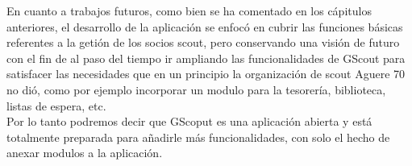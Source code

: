 En cuanto a trabajos futuros, como bien se ha comentado en los cápitulos anteriores, el desarrollo de la aplicación se enfocó en cubrir las funciones básicas
referentes a la getión de los socios scout, pero conservando una visión de futuro con el fin de al paso del tiempo ir ampliando las funcionalidades de GScout
para satisfacer las necesidades que en un principio la organización de scout Aguere 70 no dió, como por ejemplo incorporar un modulo para la tesorería, biblioteca, listas de espera, etc.\\

Por lo tanto podremos decir que GScoput es una aplicación abierta y está totalmente preparada para añadirle más funcionalidades, con solo el hecho de anexar
modulos a la aplicación.